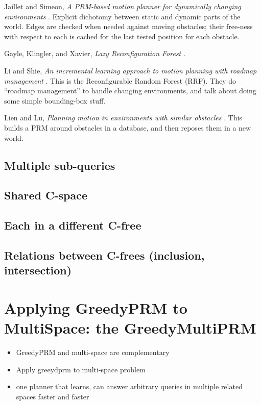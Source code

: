 \documentclass{report}
\begin{document}
Jaillet and Simeon,
\emph{A PRM-based motion planner for dynamically changing environments}
\cite{jaillet2004dynamicprm}.
Explicit dichotomy between static and dynamic parts of the world.
Edges are checked when needed against moving obstacles;
their free-ness with respect to each is cached for the last tested position
for each obstacle.

Gayle, Klingler, and Xavier,
\emph{Lazy Reconfiguration Forest}
\cite{gayle2007lazyreconfigforest}.

Li and Shie,
\emph{An incremental learning approach to motion planning with
      roadmap management}
\cite{li2002incrementalprmmanagement}.
This is the Reconfigurable Random Forest (RRF).
They do ``roadmap management'' to handle changing environments,
and talk about doing some simple bounding-box stuff.

Lien and Lu,
\emph{Planning motion in environments with similar obstacles}
\cite{lien2009similarobstacles}.
This builds a PRM around obstacles in a database,
and then reposes them in a new world.

\section{Multiple sub-queries}

\section{Shared C-space}

\section{Each in a different C-free}

\section{Relations between C-frees (inclusion, intersection)}


\newpage
\chapter{Applying GreedyPRM to MultiSpace: the GreedyMultiPRM}

\begin{itemize}
\item GreedyPRM and multi-space are complementary
\item Apply greeydprm to multi-space problem
\item one planner that learns, can answer arbitrary queries
   in multiple related spaces faster and faster
\end{itemize}
\end{document}
